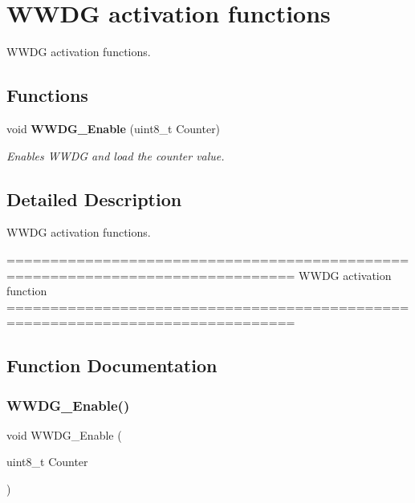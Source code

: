 \section{W\+W\+DG activation functions}
\label{group__WWDG__Group2}


W\+W\+DG activation functions.  


\subsection*{Functions}
\begin{DoxyCompactItemize}
\item 
void \textbf{ W\+W\+D\+G\+\_\+\+Enable} (uint8\+\_\+t Counter)
\begin{DoxyCompactList}\small\item\em Enables W\+W\+DG and load the counter value. \end{DoxyCompactList}\end{DoxyCompactItemize}


\subsection{Detailed Description}
W\+W\+DG activation functions. 

\begin{DoxyVerb} ===============================================================================
                       WWDG activation function
 ===============================================================================  \end{DoxyVerb}
 

\subsection{Function Documentation}
\mbox{\label{group__WWDG__Group2_ga10dc2554d0b504b5472e3ecf0f02a9e6}} 
\subsubsection{W\+W\+D\+G\+\_\+\+Enable()}
{\footnotesize\ttfamily void W\+W\+D\+G\+\_\+\+Enable (\begin{DoxyParamCaption}\item[{uint8\+\_\+t}]{Counter }\end{DoxyParamCaption})}



